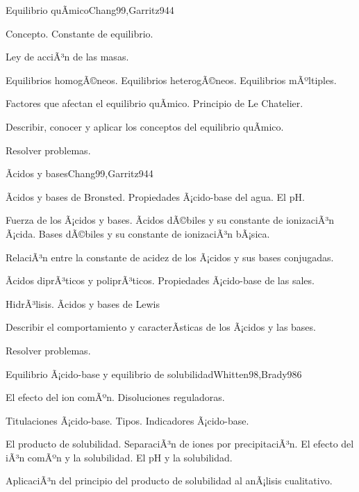 \begin{syllabus}
\begin{unit}{Equilibrio quÃ­mico}{Chang99,Garritz94}{4}
\begin{topics}
      \item Concepto. Constante de equilibrio.
      \item Ley de acciÃ³n de las masas.
      \item Equilibrios homogÃ©neos. Equilibrios heterogÃ©neos. Equilibrios mÃºltiples.
      \item Factores que afectan el equilibrio quÃ­mico. Principio de Le Chatelier.
    \end{topics}
   \begin{unitgoals}
      \item Describir, conocer y aplicar los conceptos del equilibrio quÃ­mico.
      \item Resolver problemas.
   \end{unitgoals}
\end{unit}

\begin{unit}{Ãcidos y bases}{Chang99,Garritz94}{4}
\begin{topics}
	\item Ãcidos y bases de Bronsted. Propiedades Ã¡cido-base del agua. El pH.
	\item Fuerza de los Ã¡cidos y bases. Ãcidos dÃ©biles y su constante de ionizaciÃ³n Ã¡cida. Bases dÃ©biles y su constante de ionizaciÃ³n bÃ¡sica. 
	\item RelaciÃ³n entre la constante de acidez de los Ã¡cidos y sus bases conjugadas.
	\item Ãcidos diprÃ³ticos y poliprÃ³ticos. Propiedades Ã¡cido-base de las sales.
	\item HidrÃ³lisis.  Ãcidos y bases de Lewis
\end{topics}

\begin{unitgoals}
	\item Describir el comportamiento y caracterÃ­sticas de los Ã¡cidos y las bases.
	\item Resolver problemas.
\end{unitgoals}
\end{unit}

\begin{unit}{Equilibrio Ã¡cido-base y equilibrio de solubilidad}{Whitten98,Brady98}{6}
\begin{topics}
	\item El efecto del ion comÃºn. Disoluciones reguladoras.
	\item Titulaciones Ã¡cido-base. Tipos.  Indicadores Ã¡cido-base.
	\item El producto de solubilidad. SeparaciÃ³n de iones por precipitaciÃ³n. El efecto del iÃ³n comÃºn y la solubilidad. El pH y la solubilidad.
	\item AplicaciÃ³n del principio del producto de solubilidad al anÃ¡lisis cualitativo.
\end{topics}


\end{unit}
\end{syllabus}
